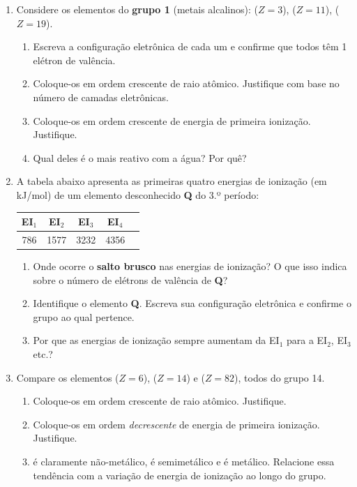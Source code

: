 \documentclass[10pt,a4paper]{article}
\begin{document}
\begin{enumerate}[resume]

\item Considere os elementos do \textbf{grupo 1} (metais alcalinos):
   ($Z=3$),  ($Z=11$),  ($Z=19$).
  \begin{enumerate}
    \item Escreva a configuração eletrônica de cada um e confirme
          que todos têm 1 elétron de valência.
    \item Coloque-os em ordem crescente de raio atômico.
          Justifique com base no número de camadas eletrônicas.
    \item Coloque-os em ordem crescente de energia de
          primeira ionização. Justifique.
    \item Qual deles é o mais reativo com a água? Por quê?
  \end{enumerate}

\item A tabela abaixo apresenta as primeiras quatro energias de
  ionização (em kJ/mol) de um elemento desconhecido \textbf{Q}
  do 3.º período:

  \begin{center}
  \begin{tabular}{ccccc}
    \toprule
    EI$_1$ & EI$_2$ & EI$_3$ & EI$_4$ \\
    \midrule
    786 & 1577 & 3232 & 4356 \\
    \bottomrule
  \end{tabular}
  \end{center}

  \begin{enumerate}
    \item Onde ocorre o \textbf{salto brusco} nas energias de
          ionização? O que isso indica sobre o número de
          elétrons de valência de \textbf{Q}?
    \item Identifique o elemento \textbf{Q}. Escreva sua
          configuração eletrônica e confirme o grupo ao qual
          pertence.
    \item Por que as energias de ionização sempre aumentam da
          EI$_1$ para a EI$_2$, EI$_3$ etc.?
  \end{enumerate}

\item Compare os elementos  ($Z=6$),  ($Z=14$) e
   ($Z=82$), todos do grupo 14.
  \begin{enumerate}
    \item Coloque-os em ordem crescente de raio atômico.
          Justifique.
    \item Coloque-os em ordem \emph{decrescente} de energia
          de primeira ionização. Justifique.
    \item {} é claramente não-metálico,  é
          semimetálico e  é metálico. Relacione essa
          tendência com a variação de energia de ionização
          ao longo do grupo.
  \end{enumerate}


\end{enumerate}
\end{document}
